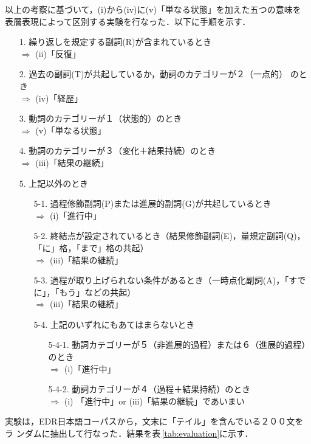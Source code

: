 以上の考察に基づいて，(i)から(iv)に(v)「単なる状態」を加えた五つの意味を
表層表現によって区別する実験を行なった．以下に手順を示す．
\begin{itemize}
\item[1.] 繰り返しを規定する副詞(R)が含まれているとき \\ 
  $\Rightarrow$ (ii)「反復」
\item[2.] 過去の副詞(T)が共起しているか，動詞のカテゴリーが２（一点的）
  のとき \\
  $\Rightarrow$ (iv)「経歴」
\item[3.] 動詞のカテゴリーが１（状態的）のとき \\ 
  $\Rightarrow$ (v)「単なる状態」
\item[4.] 動詞のカテゴリーが３（変化＋結果持続）のとき \\ 
  $\Rightarrow$ (iii)「結果の継続」
\item[5.] 上記以外のとき
  \begin{itemize}
  \item[5-1.] 過程修飾副詞(P)または進展的副詞(G)が共起しているとき \\ 
  $\Rightarrow$ (i)「進行中」
  \item[5-2.] 終結点が設定されているとき（結果修飾副詞(E)，量規定副詞(Q)，
  「に」格，「まで」格の共起） \\
  $\Rightarrow$ (iii)「結果の継続」
  \item[5-3.] 過程が取り上げられない条件があるとき（一時点化副詞(A)，「すで
  に」，「もう」などの共起） \\
  $\Rightarrow$ (iii)「結果の継続」
  \item[5-4.] 上記のいずれにもあてはまらないとき
    \begin{itemize}
    \item[5-4-1.] 動詞カテゴリーが５（非進展的過程）または６（進展的過程）
      のとき  \\ $\Rightarrow$ (i)「進行中」
    \item[5-4-2.] 動詞カテゴリーが４（過程＋結果持続）のとき \\ $\Rightarrow$
      (i) 「進行中」or (iii)「結果の継続」であいまい
    \end{itemize}
  \end{itemize}
\end{itemize}

実験は，EDR日本語コーパスから，文末に「テイル」を含んでいる２００文をラ
ンダムに抽出して行なった．結果を表\,\ref{tab:evaluation}に示す．

